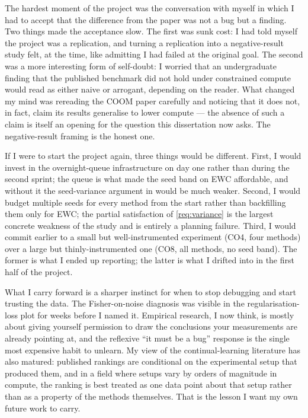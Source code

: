 The hardest moment of the project was the conversation with
myself in which I had to accept that the difference from the
paper was not a bug but a finding. Two things made the
acceptance slow. The first was sunk cost: I had told myself
the project was a replication, and turning a replication into
a negative-result study felt, at the time, like admitting I
had failed at the original goal. The second was a more
interesting form of self-doubt: I worried that an undergraduate
finding that the published benchmark did not hold under
constrained compute would read as either naive or arrogant,
depending on the reader. What changed my mind was rereading
the COOM paper carefully and noticing that it does not, in
fact, claim its results generalise to lower compute --- the
absence of such a claim is itself an opening for the question
this dissertation now asks. The negative-result framing is
the honest one.

If I were to start the project again, three things would be
different. First, I would invest in the
overnight-queue infrastructure on day one rather than during
the second sprint; the queue is what made the seed band on
EWC affordable, and without it the seed-variance argument in
 would be much weaker. Second, I would
budget multiple seeds for every method from the start rather
than backfilling them only for EWC; the partial satisfaction
of \ref{req:variance} is the largest concrete weakness of the
study and is entirely a planning failure. Third, I would
commit earlier to a small but well-instrumented experiment
(CO4, four methods) over a large but thinly-instrumented one
(CO8, all methods, no seed band). The former is what I ended
up reporting; the latter is what I drifted into in the first
half of the project.

What I carry forward is a sharper instinct for when to stop
debugging and start trusting the data. The Fisher-on-noise
diagnosis was visible in the regularisation-loss plot for
weeks before I named it. Empirical research, I now think, is
mostly about giving yourself permission to draw the
conclusions your measurements are already pointing at, and the
reflexive ``it must be a bug'' response is the single most
expensive habit to unlearn. My view of the continual-learning
literature has also matured: published rankings are
conditional on the experimental setup that produced them, and
in a field where setups vary by orders of magnitude in
compute, the ranking is best treated as one data point about
that setup rather than as a property of the methods
themselves. That is the lesson I want my own future work to
carry.
